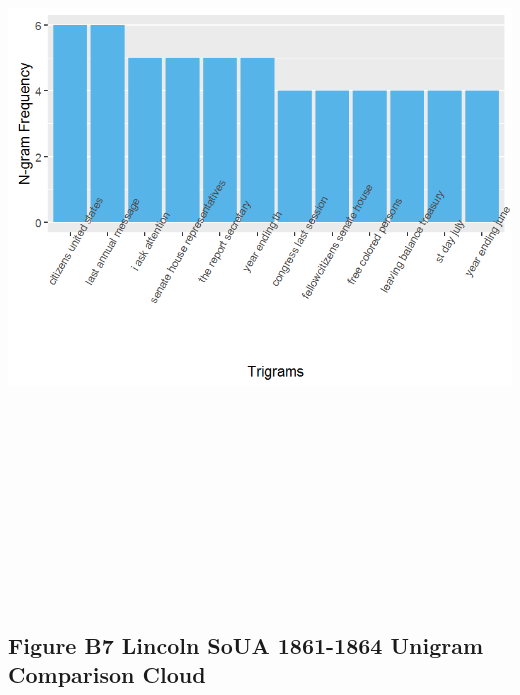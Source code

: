 \documentclass[]{article}
\begin{document}
\includegraphics[height=8.33333in]{images/Lincolndata_trigram_bar.png}

\subsection{Figure B7 Lincoln SoUA 1861-1864 Unigram Comparison
Cloud}\label{figure-b7-lincoln-soua-1861-1864-unigram-comparison-cloud}
\end{document}
